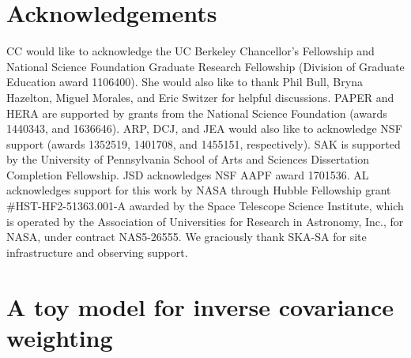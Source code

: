 \documentclass[preprint2,numberedappendix,tighten]{aastex6}  %
\begin{document}
\section{Acknowledgements}
CC would like to acknowledge the UC Berkeley Chancellor's Fellowship and National Science Foundation Graduate Research 
Fellowship (Division of Graduate Education award 1106400). She would also like to thank Phil Bull, Bryna Hazelton, Miguel Morales, and Eric Switzer for helpful discussions. PAPER and HERA 
are supported by grants from the National Science Foundation (awards 1440343, and 1636646). ARP, DCJ, and JEA would 
also like to acknowledge NSF support (awards 1352519, 1401708, and 1455151, respectively). SAK is supported by the University of Pennsylvania School of Arts and Sciences Dissertation Completion Fellowship. JSD acknowledges NSF AAPF
award 1701536. AL acknowledges support for this work by NASA through Hubble Fellowship grant \#HST-HF2-51363.001-A awarded by the Space Telescope Science Institute, which is operated by the Association of Universities for Research in Astronomy, Inc., for NASA, under contract NAS5-26555. We graciously thank SKA-SA for site infrastructure and observing support.
\label{sec:Ack}



\appendix
\section{A toy model for inverse covariance weighting}
\label{sec:icw_appendix}

\end{document}
